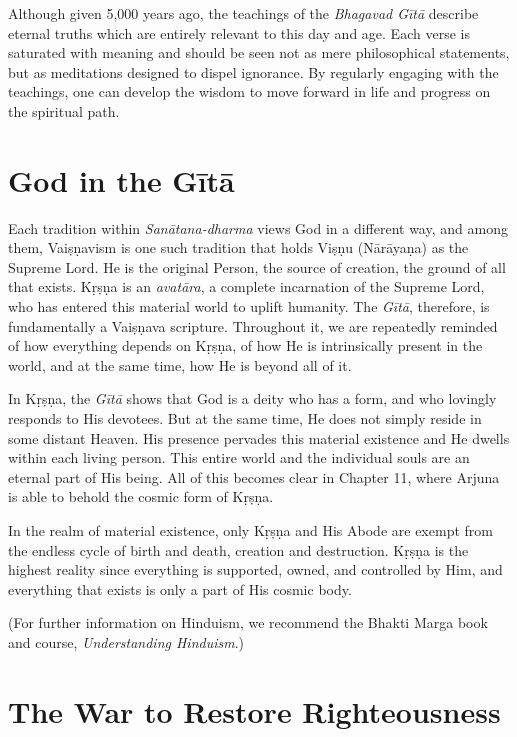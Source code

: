 Although given 5,000 years ago, the teachings of the \textit{Bhagavad Gītā} describe eternal truths which are entirely relevant to this day and age. Each verse is saturated with meaning and should be seen not as mere philosophical statements, but as meditations designed to dispel ignorance. By regularly engaging with the teachings, one can develop the wisdom to move forward in life and progress on the spiritual path.

\section{God in the Gītā}\label{sec-god-in-the-gita}

Each tradition within \textit{Sanātana-dharma} views God in a different way, and among them, Vaiṣṇavism is one such tradition that holds Viṣṇu (Nārāyaṇa) as the Supreme Lord. He is the original Person, the source of creation, the ground of all that exists. Kṛṣṇa is an \textit{avatāra}, a complete incarnation of the Supreme Lord, who has entered this material world to uplift humanity. The \textit{Gītā}, therefore, is fundamentally a Vaiṣṇava scripture. Throughout it, we are repeatedly reminded of how everything depends on Kṛṣṇa, of how He is intrinsically present in the world, and at the same time, how He is beyond all of it.

In Kṛṣṇa, the \textit{Gītā} shows that God is a deity who has a form, and who lovingly responds to His devotees. But at the same time, He does not simply reside in some distant Heaven. His presence pervades this material existence and He dwells within each living person. This entire world and the individual souls are an eternal part of His being. All of this becomes clear in Chapter 11, where Arjuna is able to behold the cosmic form of Kṛṣṇa.

In the realm of material existence, only Kṛṣṇa and His Abode are exempt from the endless cycle of birth and death, creation and destruction. Kṛṣṇa is the highest reality since everything is supported, owned, and controlled by Him, and everything that exists is only a part of His cosmic body.

(For further information on Hinduism, we recommend the Bhakti Marga book and course, \textit{Understanding Hinduism}.)

\section{The War to Restore Righteousness}\label{sec-the-war-to-restore-righteousness}

